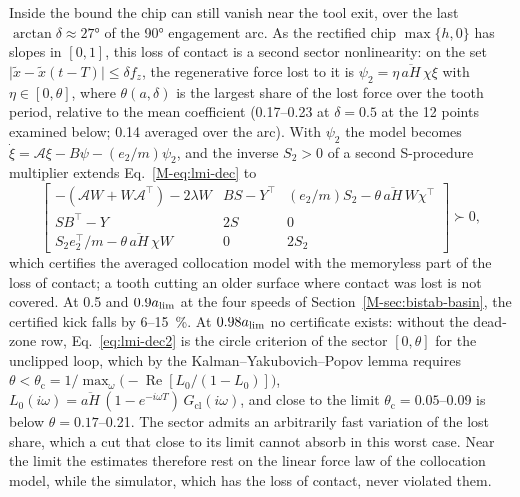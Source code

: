 Inside the bound the chip can still vanish near the tool exit, over the last $\arctan\delta\approx\ang{27}$ of the \ang{90} engagement arc. As the rectified chip $\max\{h,0\}$ has slopes in $[0,1]$, this loss of contact is a second sector nonlinearity: on the set $\lvert\tilde x-\tilde x(t-T)\rvert\le\delta f_z$, the regenerative force lost to it is $\psi_2=\eta\,\overline{aH}\,\chi\xi$ with $\eta\in[0,\theta]$, where $\theta(a,\delta)$ is the largest share of the lost force over the tooth period, relative to the mean coefficient (0.17--0.23 at $\delta=0.5$ at the 12 points examined below; 0.14 averaged over the arc). With $\psi_2$ the model becomes $\dot\xi=\mathcal A\xi-B\psi-(e_2/m)\psi_2$, and the inverse $S_2>0$ of a second S-procedure multiplier extends Eq.~\eqref{M-eq:lmi-dec} to
\begin{equation}\label{eq:lmi-dec2}
\begin{bmatrix}-(\mathcal AW+W\mathcal A^\top)-2\lambda W & BS-Y^\top & (e_2/m)S_2-\theta\,\overline{aH}\,W\chi^\top\\ SB^\top-Y & 2S & 0\\ S_2e_2^\top/m-\theta\,\overline{aH}\,\chi W & 0 & 2S_2\end{bmatrix}\succ0 ,
\end{equation}
which certifies the averaged collocation model with the memoryless part of the loss of contact; a tooth cutting an older surface where contact was lost is not covered. At 0.5 and $0.9a_{\lim}$ at the four speeds of Section~\ref{M-sec:bistab-basin}, the certified kick falls by 6--\SI{15}{\percent}. At $0.98a_{\lim}$ no certificate exists: without the dead-zone row, Eq.~\eqref{eq:lmi-dec2} is the circle criterion of the sector $[0,\theta]$ for the unclipped loop, which by the Kalman--Yakubovich--Popov lemma requires $\theta<\theta_{\mathrm{c}}=1/\max_\omega\bigl(-\operatorname{Re}[L_0/(1-L_0)]\bigr)$, $L_0(i\omega)=\overline{aH}\,(1-e^{-i\omega T})\,G_{\mathrm{cl}}(i\omega)$, and close to the limit $\theta_{\mathrm{c}}=0.05$--0.09 is below $\theta=0.17$--0.21. The sector admits an arbitrarily fast variation of the lost share, which a cut that close to its limit cannot absorb in this worst case. Near the limit the estimates therefore rest on the linear force law of the collocation model, while the simulator, which has the loss of contact, never violated them.

